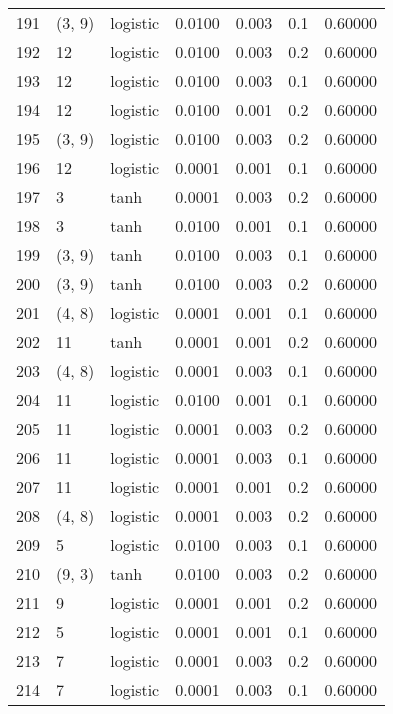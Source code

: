 \begin{tabular}{lllrrrr}
191 &      (3, 9) &  logistic &  0.0100 &  0.003 &  0.1 &   0.60000 \\
192 &          12 &  logistic &  0.0100 &  0.003 &  0.2 &   0.60000 \\
193 &          12 &  logistic &  0.0100 &  0.003 &  0.1 &   0.60000 \\
194 &          12 &  logistic &  0.0100 &  0.001 &  0.2 &   0.60000 \\
195 &      (3, 9) &  logistic &  0.0100 &  0.003 &  0.2 &   0.60000 \\
196 &          12 &  logistic &  0.0001 &  0.001 &  0.1 &   0.60000 \\
197 &           3 &      tanh &  0.0001 &  0.003 &  0.2 &   0.60000 \\
198 &           3 &      tanh &  0.0100 &  0.001 &  0.1 &   0.60000 \\
199 &      (3, 9) &      tanh &  0.0100 &  0.003 &  0.1 &   0.60000 \\
200 &      (3, 9) &      tanh &  0.0100 &  0.003 &  0.2 &   0.60000 \\
201 &      (4, 8) &  logistic &  0.0001 &  0.001 &  0.1 &   0.60000 \\
202 &          11 &      tanh &  0.0001 &  0.001 &  0.2 &   0.60000 \\
203 &      (4, 8) &  logistic &  0.0001 &  0.003 &  0.1 &   0.60000 \\
204 &          11 &  logistic &  0.0100 &  0.001 &  0.1 &   0.60000 \\
205 &          11 &  logistic &  0.0001 &  0.003 &  0.2 &   0.60000 \\
206 &          11 &  logistic &  0.0001 &  0.003 &  0.1 &   0.60000 \\
207 &          11 &  logistic &  0.0001 &  0.001 &  0.2 &   0.60000 \\
208 &      (4, 8) &  logistic &  0.0001 &  0.003 &  0.2 &   0.60000 \\
209 &           5 &  logistic &  0.0100 &  0.003 &  0.1 &   0.60000 \\
210 &      (9, 3) &      tanh &  0.0100 &  0.003 &  0.2 &   0.60000 \\
211 &           9 &  logistic &  0.0001 &  0.001 &  0.2 &   0.60000 \\
212 &           5 &  logistic &  0.0001 &  0.001 &  0.1 &   0.60000 \\
213 &           7 &  logistic &  0.0001 &  0.003 &  0.2 &   0.60000 \\
214 &           7 &  logistic &  0.0001 &  0.003 &  0.1 &   0.60000 \\

\end{tabular}
